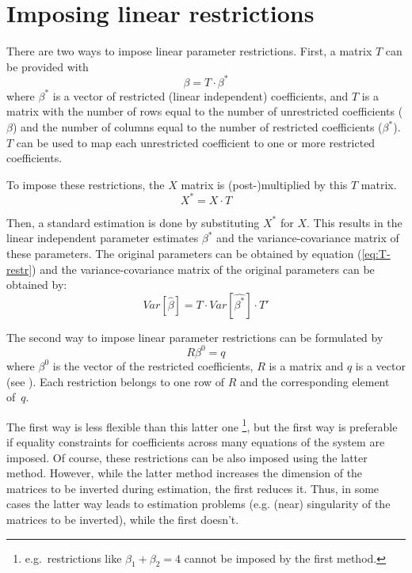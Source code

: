 \section{Imposing linear restrictions}
\label{sec:Restrictions}

There are two ways to impose linear parameter restrictions.  First, a
matrix $T$ can be provided with
\begin{equation}
   \beta = T \cdot \beta^* \label{eq:T-restr} 
\end{equation}
where $\beta^*$ is a vector of restricted (linear independent) coefficients,
and $T$ is a matrix with the number of rows equal to the number of
unrestricted coefficients ($\beta$) and
the number of columns equal to the number of restricted coefficients
($\beta^*$).
$T$ can be used to map each unrestricted coefficient to one or more
restricted coefficients.

To impose these restrictions, the $X$ matrix is (post-)multiplied by
this $T$ matrix.
\begin{equation}
    X^* = X \cdot T
\end{equation}

Then, a standard estimation is done by substituting $X^*$ for $X$.
This results in the linear independent parameter estimates $\beta^*$ and
the variance-covariance matrix of these parameters. 
The original parameters can be obtained by equation (\ref{eq:T-restr})
and the variance-covariance matrix of the original parameters 
can be obtained by:
\begin{equation}
   Var \left[ \widehat{\beta} \right] = T \cdot Var \left[ \widehat{\beta^*} \right] \cdot T'
\end{equation}

The second way to impose linear parameter restrictions 
can be formulated by
\begin{equation}
   R \beta^0 = q
\end{equation}
where $\beta^0$ is the vector of the restricted coefficients, 
$R$ is a matrix and $q$ is a vector (see \citealp[p. 100]{greene02}). 
Each restriction belongs to one row of $R$ and the corresponding 
element of~$q$.

The first way is less flexible than this latter one%
\footnote{e.g.\ restrictions like $\beta_1 + \beta_2 = 4$ cannot be imposed
by the first method.}, 
but the first way is preferable if equality constraints for coefficients
across many equations of the system are imposed. 
Of course, these restrictions can be also imposed using
the latter method.
However, while the latter method increases the dimension of the 
matrices to be inverted during estimation, the first reduces it. 
Thus, in some cases the latter way leads to estimation problems
(e.g. (near) singularity of the matrices to be inverted),
while the first doesn't.

